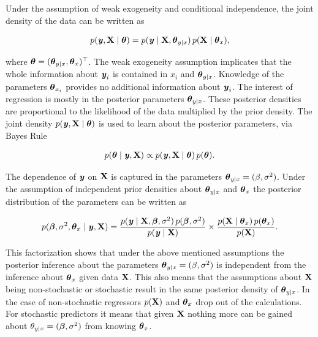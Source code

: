 \documentclass[11pt,a4paper,twoside]{book}\usepackage[]{graphicx}\usepackage[]{color}
\begin{document}
Under the assumption of weak exogeneity and conditional independence, the joint density of the data can be written as

       \begin{align*} 
p({\textbf{\textit{y}}}, {\mathbf{X}} \mid {\boldsymbol{\theta}}{}) = p({\textbf{\textit{y}}} \mid {\mathbf{X}}, {\boldsymbol{\theta}}{}_{y \mid x}) \, p({\mathbf{X}} \mid {\boldsymbol{\theta}}{}_{x}),
   \end{align*}

where ${\boldsymbol{\theta}}{} = ({\boldsymbol{\theta}}{}_{y \mid x}, {\boldsymbol{\theta}}{}_{x})^\top$. The weak exogeneity assumption implicates that the whole information about ${\textbf{\textit{y}}}_{i}$ is contained in $x_{i}$ and ${\boldsymbol{\theta}}{}_{y \mid x}$. Knowledge of the parameters ${\boldsymbol{\theta}}{}_{x_{i}}$ provides no additional information about ${\textbf{\textit{y}}}_{i}$.
The interest of regression is mostly in the posterior parameters ${\boldsymbol{\theta}}{}_{y \mid x}$. These posterior densities are proportional to the likelihood of the data  multiplied by the prior density. The joint density $p({\textbf{\textit{y}}}, {\mathbf{X}} \mid  {\boldsymbol{\theta}}{})$ is used to learn about the posterior parameters, via Bayes Rule

       \begin{align*} 
p({\boldsymbol{\theta}}{} \mid {\textbf{\textit{y}}}, {\mathbf{X}}) \propto p({\textbf{\textit{y}}}, {\mathbf{X}} \mid  {\boldsymbol{\theta}}{}) \, p({\boldsymbol{\theta}}{}).
   \end{align*}
   
   The dependence of ${\textbf{\textit{y}}}$ on ${\mathbf{X}}$ is captured in the parameters ${\boldsymbol{\theta}}{}_{y \mid x} = (\beta, \sigma^2)$. Under the assumption of independent prior densities about ${\boldsymbol{\theta}}{}_{y \mid x}$ and ${\boldsymbol{\theta}}{}_{x}$ the posterior distribution of the parameters can be written as
   
          \begin{align} 
p({\boldsymbol{\beta}}, \sigma^2, {\boldsymbol{\theta}}{}_{x} \mid {\textbf{\textit{y}}}, {\mathbf{X}}) = \frac{p({\textbf{\textit{y}}} \mid {\mathbf{X}}, {\boldsymbol{\beta}}, \sigma^2) \, p({\boldsymbol{\beta}}, \sigma^2)}{p({\textbf{\textit{y}}} \mid {\mathbf{X}})} \times \frac{p({\mathbf{X}} \mid {\boldsymbol{\theta}}{}_{x}) \, p({\boldsymbol{\theta}}{}_{x})}{p({\mathbf{X}})}.  \label{eq:bayesf} 
   \end{align}
   
  This factorization shows that under the above mentioned assumptions the posterior inference about the parameters ${\boldsymbol{\theta}}{}_{y \mid x} = (\beta, \sigma^2)$ is independent from the inference about ${\boldsymbol{\theta}}{}_{x}$ given data ${\mathbf{X}}$. This also means that the assumptions about ${\mathbf{X}}$ being non-stochastic or stochastic result in the same posterior density of  ${\boldsymbol{\theta}}{}_{y \mid x}$. In the case of non-stochastic regressors $p({\mathbf{X}})$ and ${\boldsymbol{\theta}}{}_{x}$ drop out of the calculations. For stochastic predictors it means that given ${\mathbf{X}}$ nothing more can be gained about $\theta_{y \mid x} = ({\boldsymbol{\beta}}, \sigma^2)$ from knowing ${\boldsymbol{\theta}}{}_{x}$. 
  
\end{document}

